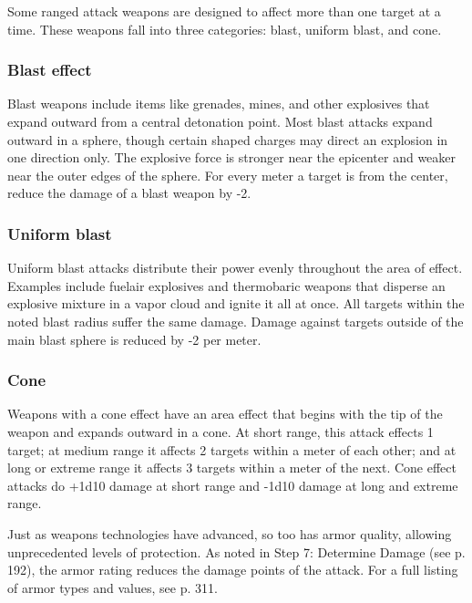 Some ranged attack weapons are designed to affect more than one target at a time. These weapons fall into three categories: blast, uniform blast, and cone. 

\subsubsection{Blast effect} 

Blast weapons include items like grenades, mines, and other explosives that expand outward from a central detonation point. Most blast attacks expand outward in a sphere, though certain shaped charges may direct an explosion in one direction only. The explosive force is stronger near the epicenter and weaker near the outer edges of the sphere. For every meter a target is from the center, reduce the damage of a blast weapon by -2. 

\subsubsection{Uniform blast} 

Uniform blast attacks distribute their power evenly throughout the area of effect. Examples include fuelair explosives and thermobaric weapons that disperse an explosive mixture in a vapor cloud and ignite it all at once. All targets within the noted blast radius suffer the same damage. Damage against targets outside of the main blast sphere is reduced by -2 per meter. 

\subsubsection{Cone} 

Weapons with a cone effect have an area effect that begins with the tip of the weapon and expands outward in a cone. At short range, this attack effects 1 target; at medium range it affects 2 targets within a meter of each other; and at long or extreme range it affects 3 targets within a meter of the next. Cone effect attacks do +1d10 damage at short range and -1d10 damage at long and extreme range. 



\label{sec:combat-armor} 

Just as weapons technologies have advanced, so too has armor quality, allowing unprecedented levels of protection. As noted in Step 7: Determine Damage (see p. 192), the armor rating reduces the damage points of the attack. For a full listing of armor types and values, see p. 311. 


